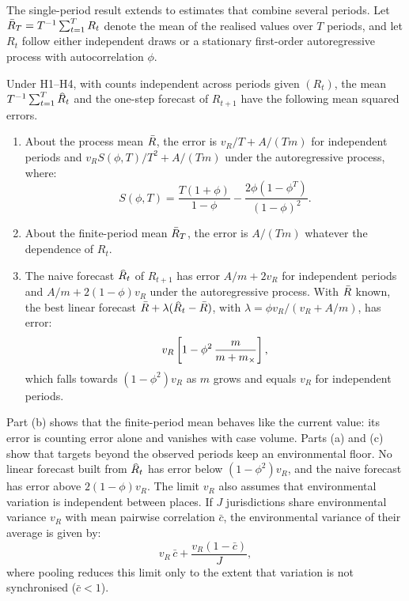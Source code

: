 The single-period result extends to estimates that combine several periods. Let $\bar{R}_T=T^{-1}\sum_{t=1}^T R_t$ denote the mean of the realised values over $T$ periods, and let $R_t$ follow either independent draws or a stationary first-order autoregressive process with autocorrelation $\phi$.

\begin{corollary}
\label{cor:targets}
Under H1--H4, with counts independent across periods given $(R_t)$, the mean $T^{-1}\sum_{t=1}^T\Rhat_t$ and the one-step forecast of $R_{t+1}$ have the following mean squared errors.
\begin{enumerate}[label=(\alph*),leftmargin=2em]
  \item About the process mean $\bar{R}$, the error is $v_R/T+A/(Tm)$ for independent periods and $v_RS(\phi,T)/T^2+A/(Tm)$ under the autoregressive process, where:
  \begin{equation}
    S(\phi,T)=\frac{T(1+\phi)}{1-\phi}-\frac{2\phi(1-\phi^T)}{(1-\phi)^2}.
    \label{eq:ar-sum}
  \end{equation}
  \item About the finite-period mean $\bar{R}_T$, the error is $A/(Tm)$ whatever the dependence of $R_t$.
  \item The naive forecast $\Rhat_t$ of $R_{t+1}$ has error $A/m+2v_R$ for independent periods and $A/m+2(1-\phi)v_R$ under the autoregressive process. With $\bar{R}$ known, the best linear forecast $\Rbar+\lambda(\Rhat_t-\Rbar)$, with $\lambda=\phi v_R/(v_R+A/m)$, has error:
  \begin{equation}
    v_R\left[1-\phi^2\,\frac{m}{m+m_{\times}}\right],
    \label{eq:forecast}
  \end{equation}
  which falls towards $(1-\phi^2)v_R$ as $m$ grows and equals $v_R$ for independent periods.
\end{enumerate}
\end{corollary}

Part (b) shows that the finite-period mean behaves like the current value: its error is counting error alone and vanishes with case volume. Parts (a) and (c) show that targets beyond the observed periods keep an environmental floor. No linear forecast built from $\Rhat_t$ has error below $(1-\phi^2)v_R$, and the naive forecast has error above $2(1-\phi)v_R$. The limit $v_R$ also assumes that environmental variation is independent between places. If $J$ jurisdictions share environmental variance $v_R$ with mean pairwise correlation $\bar{c}$, the environmental variance of their average is given by:
\begin{equation}
  v_R\,\bar{c}+\frac{v_R(1-\bar{c})}{J},
  \label{eq:pooling}
\end{equation}
where pooling reduces this limit only to the extent that variation is not synchronised ($\bar{c}<1$).

